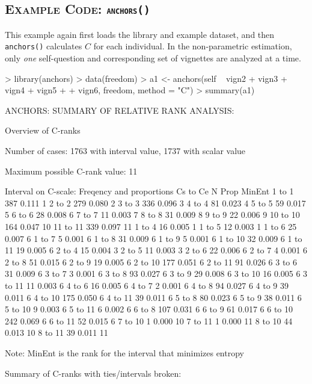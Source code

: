 \documentclass{amsart}
\newcommand{\code}[1]{{\texttt{#1}}}
\newcommand{\ssubsection}[2]{%
  \subsection[#1]{\normalfont\scshape #1: {\tt #2}}}
\begin{document}
\ssubsection{Example Code}{anchors()}
This example again first loads the library and example dataset, and
then \code{anchors()} calculates $C$ for each individual.  In the
non-parametric estimation, only \emph{one} self-question and
corresponding set of vignettes are analyzed at a time.
\begin{Schunk}
\begin{Sinput}
> library(anchors)
> data(freedom)
> a1 <- anchors(self ~ vign2 + vign3 + vign4 + vign5 + 
+     vign6, freedom, method = "C")
> summary(a1)
\end{Sinput}
\begin{Soutput}
ANCHORS: SUMMARY OF RELATIVE RANK ANALYSIS:

Overview of C-ranks

Number of cases: 1763 with interval value, 1737 with scalar value

Maximum possible C-rank value: 11

Interval on C-scale: Freqency and proportions Cs to Ce
           N  Prop MinEnt
 1 to  1 387 0.111      1
 2 to  2 279 0.080      2
 3 to  3 336 0.096      3
 4 to  4  81 0.023      4
 5 to  5  59 0.017      5
 6 to  6  28 0.008      6
 7 to  7  11 0.003      7
 8 to  8  31 0.009      8
 9 to  9  22 0.006      9
10 to 10 164 0.047     10
11 to 11 339 0.097     11
 1 to  4  16 0.005      1
 1 to  5  12 0.003      1
 1 to  6  25 0.007      6
 1 to  7   5 0.001      6
 1 to  8  31 0.009      6
 1 to  9   5 0.001      6
 1 to 10  32 0.009      6
 1 to 11  19 0.005      6
 2 to  4  15 0.004      3
 2 to  5  11 0.003      3
 2 to  6  22 0.006      6
 2 to  7   4 0.001      6
 2 to  8  51 0.015      6
 2 to  9  19 0.005      6
 2 to 10 177 0.051      6
 2 to 11  91 0.026      6
 3 to  6  31 0.009      6
 3 to  7   3 0.001      6
 3 to  8  93 0.027      6
 3 to  9  29 0.008      6
 3 to 10  16 0.005      6
 3 to 11  11 0.003      6
 4 to  6  16 0.005      6
 4 to  7   2 0.001      6
 4 to  8  94 0.027      6
 4 to  9  39 0.011      6
 4 to 10 175 0.050      6
 4 to 11  39 0.011      6
 5 to  8  80 0.023      6
 5 to  9  38 0.011      6
 5 to 10   9 0.003      6
 5 to 11   6 0.002      6
 6 to  8 107 0.031      6
 6 to  9  61 0.017      6
 6 to 10 242 0.069      6
 6 to 11  52 0.015      6
 7 to 10   1 0.000     10
 7 to 11   1 0.000     11
 8 to 10  44 0.013     10
 8 to 11  39 0.011     11

Note: MinEnt is the rank for the interval that minimizes entropy

Summary of C-ranks with ties/intervals broken:


\end{Soutput}
\end{Schunk}
\end{document}
